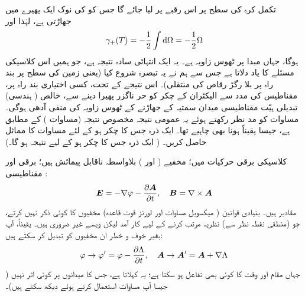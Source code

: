 تکمل کرہ کی سطح پر اس رقبے پر لیا جائے گا جس کو  کی نوک ایک پھیرے میں جھاڑتی ہے، لہٰذا  اور 
\begin{align}\label{مساوات_حر_عمومی_نتیجہ}
\gamma_{+} (T) = - \frac{1}{2} \int \dif \Omega = - \frac{1}{2} \Omega
\end{align}
ہوگا، جہاں مبدا پر ٹھوس زاویہ  ہے۔ یہ ایک انتہائی سادہ نتیجہ ہے، جو ہمیں اس کلاسیکی مسئلے کا یاد دلاتا ہے جس سے ہم نے یہ تبصرہ شروع کیا (یعنی زمین کی سطح پر بند راہ پر بلا رگڑ رقاص کی منتقلی)۔ اس نتیجے کے تحت، کسی اختیاری بند راہ پر، مقناطیس کی مدد سے الیکٹران کے چکر کو حر ناگزر پھیرا دینے سے، خالص ( ہندسی) تبدیلی ہیّت مقناطیسی میدان سمتیہ کے جھاڑنے کے ٹھوس زاویہ کی منفی آدھی ہوگی۔ مساوات  کو مد نظر رکھتے ہوئے یہ عمومی نتیجہ مخصوص نتیجہ (مساوات ) کے مطابق ہے، جیسا یقیناً ہونا بھی چاہیے تھا۔
ایک ذرہ جس کا چکر  ہو کے لئے مساوات  کا مماثل حاصل کریں۔   ( ایک ذرہ جس کا چکر  ہو کے لیے نتیجہ  ہو گا۔)




کلاسیکی برقی حرکیات میں؛ مخفیے (  اور )  بلاواسطہ ناقابل پیمائش ہیں؛ برقی اور مقناطیسی : 
\begin{align}\label{مساوات_حر_طبیعی_میدان}
{\ensuremath{{\boldsymbol{E}}}} = - \nabla \varphi - \frac{\partial {\ensuremath{{\boldsymbol{A}}}}}{\partial t}, \quad {\ensuremath{{\boldsymbol{B}}}} = \nabla \times {\ensuremath{{\boldsymbol{A}}}}
\end{align}
 مقادیر ہیں۔ بنیادی قوانین ( میکسویل مساوات اور لورنز قوت قاعدہ) مخفیوں کا کوئی ذکر نہیں کرتے، جو (منطقی نقطہ نظر سے) نظریہ مرتب کرنے کے لیے کار آمد لیکن ویسے غیر ضروری ہیں۔ یقیناً، آپ بغیر خوف و خطر ان مخفیوں کو تبدیل کر سکتے ہیں: 
\begin{align}
\varphi \to \varphi' = \varphi - \frac{\partial \Lambda}{\partial t}, \quad {\ensuremath{{\boldsymbol{A}}}} \to {\ensuremath{{\boldsymbol{A}}}}' = {{\boldsymbol{A}}} + \nabla \Lambda
\end{align}
جہاں  مقام اور وقت کا کوئی بھی تفاعل ہو سکتا ہے؛ یہ  کہلاتا ہے، جس کا میدانوں پر کوئی اثر نہیں ( جیسا آپ مساوات  استعمال کرتے ہوئے دیکھ سکتے ہیں)۔ 

